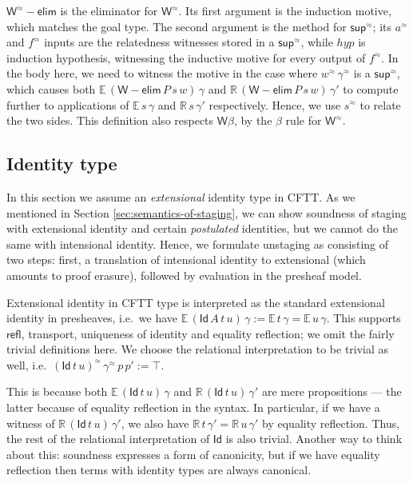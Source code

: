 \documentclass[acmsmall,screen]{acmart}
\newcommand{\msf}[1]{{\mathsf{#1}}}
\newcommand{\mbb}[1]{\mathbb{#1}}
\newcommand{\rel}{^{\approx}}
\newcommand{\Id}{\msf{Id}}
\newcommand{\ev}{\mbb{E}}
\newcommand{\re}{\mbb{R}}
\newcommand{\welim}{\vW{-}\msf{elim}}
\newcommand{\vW}{\mathsf{W}}
\newcommand{\vsup}{\mathsf{sup}}
\theoremstyle{remark}
\begin{document}
$\vW\rel{-}\msf{elim}$ is the eliminator for $\vW\rel$. Its first argument is
the induction motive, which matches the goal type. The second argument is the
method for $\vsup\rel$; its $a\rel$ and $f\rel$ inputs are the relatedness
witnesses stored in a $\vsup\rel$, while $\mathit{hyp}$ is induction hypothesis,
witnessing the inductive motive for every output of $f\rel$. In the body here,
we need to witness the motive in the case where $w\rel\,\gamma\rel$ is a $\vsup\rel$, which causes
both $\ev\,(\welim\,P\,s\,w)\,\gamma$ and $\re\,(\welim\,P\,s\,w)\,\gamma'$ to
compute further to applications of $\ev\,s\,\gamma$ and $\re\,s\,\gamma'$
respectively. Hence, we use $s\rel$ to relate the two sides. This definition
also respects $\vW\beta$, by the $\beta$ rule for $\vW\rel$.

\subsection{Identity type}

In this section we assume an \emph{extensional} identity type in CFTT. As we
mentioned in Section \ref{sec:semantics-of-staging}, we can show soundness of staging with
extensional identity and certain \emph{postulated} identities, but we cannot do
the same with intensional identity. Hence, we formulate unstaging as consisting
of two steps: first, a translation of intensional identity to extensional (which
amounts to proof erasure), followed by evaluation in the presheaf model.

Extensional identity in CFTT type is interpreted as the standard extensional
identity in presheaves, i.e.\ we have $\ev\,(\msf{Id}\,A\,t\,u)\,\gamma :=
\ev\,t\,\gamma = \ev\,u\,\gamma$. This supports $\msf{refl}$, transport,
uniqueness of identity and equality reflection; we omit the fairly trivial
definitions here. We choose the relational interpretation to be trivial as well,
i.e.\ $(\msf{Id}\,t\,u)\rel\,\gamma\rel\,p\,p' := \top$.

This is because both $\ev\,(\Id\,t\,u)\,\gamma$ and $\re\,(\Id\,t\,u)\,\gamma'$
are mere propositions --- the latter because of equality reflection in the
syntax.  In particular, if we have a witness of $\re\,(\Id\,t\,u)\,\gamma'$, we
also have $\re\,t\,\gamma' = \re\,u\,\gamma'$ by equality reflection. Thus, the
rest of the relational interpretation of $\Id$ is also trivial. Another way to
think about this: soundness expresses a form of canonicity, but if we have
equality reflection then terms with identity types are always canonical.
\end{document}
